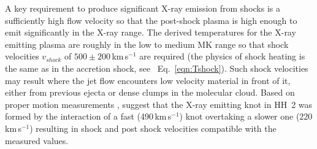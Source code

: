 A key requirement to produce significant X-ray emission from shocks is a sufficiently high flow velocity so that the post-shock plasma is high enough to emit significantly in the X-ray range. The derived temperatures for the X-ray emitting plasma are roughly  in the low to medium MK range so that shock velocities $v_{shock}$ of $500\pm200$\,km\,s$^{-1}$ are required (the physics of shock heating is the same as in the accretion shock, see ~Eq.~\ref{eqn:Tshock}). Such shock velocities may result where the jet flow encounters low velocity  material in front of it, either from previous ejecta or dense clumps in the molecular cloud. Based on proper motion measurements \citep{Eisloffel_1994}, \citet{Schneider_2012} suggest that the X-ray emitting knot in HH~2 was formed by the interaction of a fast (490\,km\,s$^{-1}$) knot overtaking a slower one (220\,km\,s$^{-1}$) resulting in shock and post shock velocities compatible with the measured values.



